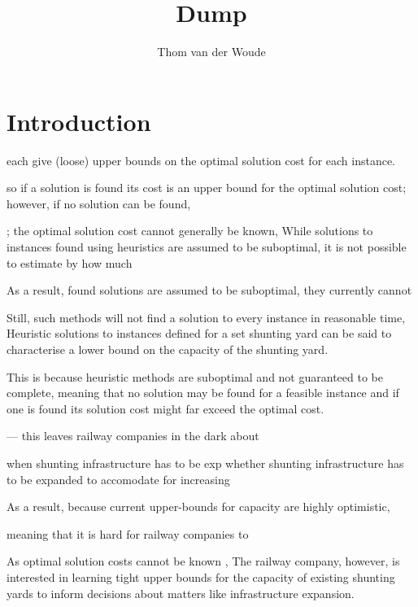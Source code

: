\documentclass[english]{article}
\begin{document}
	
	\title{Dump}
	
	\author{Thom van der Woude}
	\date{}
	
	\maketitle

	\section{Introduction}
			
		
		
		each give (loose) upper bounds on the optimal solution cost for each instance.
		
		so if a solution is found its cost is an upper bound for the optimal solution cost; however, if no solution can be found, 
		
		; the optimal solution cost cannot generally be known, 
		While solutions to instances found using heuristics are assumed to be suboptimal, it is not possible to estimate by how much 
		
		As a result, found solutions are assumed to be suboptimal, they currently cannot 
		
		Still, such methods will not find a solution to every instance in reasonable time,
		Heuristic solutions to instances defined for a set shunting yard can be said to characterise a lower bound on the capacity of the shunting yard.  
		
		This is because heuristic methods are suboptimal and not guaranteed to be complete, meaning that no solution may be found for a feasible instance and if one is found its solution cost might far exceed the optimal cost.  
		
		
		---
			this leaves railway companies in the dark about 
		
		when shunting infrastructure has to be exp whether shunting infrastructure has to be expanded to accomodate for increasing     
		
		As a result, because current upper-bounds for capacity are highly optimistic, 
		
		
		meaning that it is hard for railway companies to 
		
		As optimal solution costs cannot be known \cite{geiger2018}, 
		The railway company, however, is interested in learning tight upper bounds for the capacity of existing shunting yards to inform decisions about matters like infrastructure expansion. 
\end{document}
